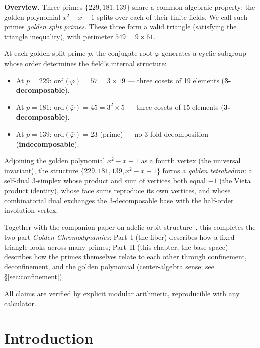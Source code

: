 \documentclass[12pt,oneside]{article}
\theoremstyle{principia}
\theoremstyle{definition}
\theoremstyle{remark}
\begin{document}
\vspace{1em}\noindent\textbf{Overview.}
Three primes $\{229, 181, 139\}$ share a common algebraic property:
the golden polynomial $x^2 - x - 1$ splits over each of their finite
fields. We call such primes \emph{golden split primes}. These three
form a valid triangle (satisfying the triangle inequality), with
perimeter $549 = 9 \times 61$.

At each golden split prime $p$, the conjugate root
$\bar\varphi$ generates a cyclic subgroup whose order determines
the field's internal structure:
\begin{itemize}
  \item At $p = 229$: $\mathrm{ord}(\bar\varphi) = 57 = 3 \times 19$
    --- three cosets of 19 elements (\textbf{3-decomposable}).
  \item At $p = 181$: $\mathrm{ord}(\bar\varphi) = 45 = 3^2 \times 5$
    --- three cosets of 15 elements (\textbf{3-decomposable}).
  \item At $p = 139$: $\mathrm{ord}(\bar\varphi) = 23$ (prime)
    --- no 3-fold decomposition (\textbf{indecomposable}).
\end{itemize}

Adjoining the golden polynomial $x^2 - x - 1$ as a fourth vertex
(the universal invariant), the structure $\{229, 181, 139, x^2{-}x{-}1\}$
forms a \emph{golden tetrahedron}: a self-dual 3-simplex whose
product and sum of vertices both equal $-1$ (the Vieta product
identity), whose face sums reproduce its own vertices, and whose
combinatorial dual exchanges the 3-decomposable base with the
half-order involution vertex.

Together with the companion paper on adelic orbit
structure~\cite{dwm_fst}, this completes the two-part
\emph{Golden Chromodynamics}: Part~I (the fiber) describes how a
fixed triangle looks across many primes; Part~II (this chapter,
the base space) describes how the primes themselves relate
to each other through confinement, deconfinement, and the
golden polynomial (center-algebra sense; see \S\ref{sec:confinement}).

All claims are verified by explicit modular arithmetic, reproducible
with any calculator.
\vspace{1em}


\newpage


\section{Introduction}
\label{sec:intro}
\end{document}
